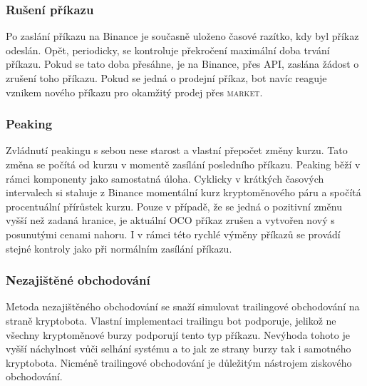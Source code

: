 \subsubsection{Rušení příkazu}
Po zaslání příkazu na Binance je současně uloženo časové razítko, kdy byl příkaz odeslán. Opět, periodicky, se kontroluje překročení maximální doba trvání příkazu. Pokud se tato doba přesáhne,
je na Binance, přes API, zaslána žádost o zrušení toho příkazu. Pokud se jedná o prodejní příkaz, bot navíc reaguje vznikem nového příkazu pro okamžitý prodej přes \textsc{market}.

\subsubsection{Peaking}
Zvládnutí peakingu s sebou nese starost a vlastní přepočet změny kurzu. Tato změna se počítá od kurzu v momentě zasílání posledního příkazu. Peaking běží v rámci komponenty jako samostatná úloha.
Cyklicky v krátkých časových intervalech si stahuje z Binance momentální kurz kryptoměnového páru a spočítá procentuální přírůstek kurzu. Pouze v případě, že se jedná o pozitivní změnu vyšší než zadaná hranice, je
aktuální \textsc{OCO} příkaz zrušen a vytvořen nový s posunutými cenami nahoru. I v rámci této rychlé výměny příkazů se provádí stejné kontroly jako při normálním zasílání příkazu.

\subsubsection{Nezajištěné obchodování}
Metoda nezajištěného obchodování se snaží simulovat trailingové obchodování na straně kryptobota. Vlastní implementaci trailingu bot podporuje, jelikož ne všechny kryptoměnové burzy podporují tento typ příkazu.
Nevýhoda tohoto je vyšší náchylnost vůči selhání systému a to jak ze strany burzy tak i samotného kryptobota. Nicméně trailingové obchodování je důležitým nástrojem ziskového obchodování.

